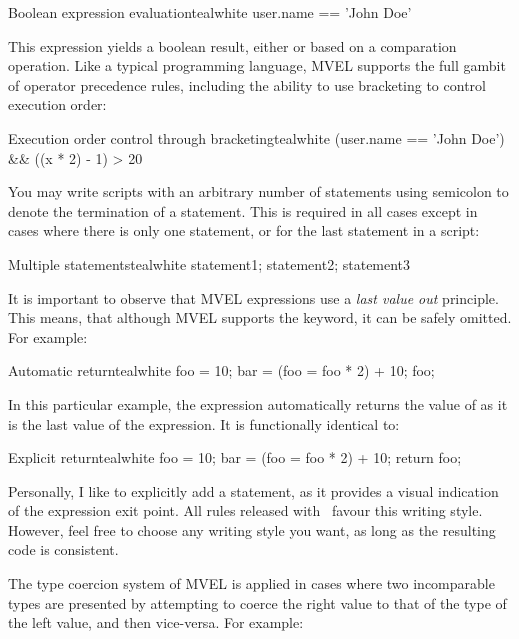 \begin{codebox}{Boolean expression evaluation}{teal}{\icnote}{white}
user.name == 'John Doe'
\end{codebox}

This expression yields a boolean result, either  or  based on a comparation operation. Like a typical programming language, MVEL supports the full gambit of operator precedence rules, including the ability to use bracketing to control execution order:

\begin{codebox}{Execution order control through bracketing}{teal}{\icnote}{white}
(user.name == 'John Doe') && ((x * 2) - 1) > 20
\end{codebox}

You may write scripts with an arbitrary number of statements using semicolon to denote the termination of a statement. This is required in all cases except in cases where there is only one statement, or for the last statement in a script:

\begin{codebox}{Multiple statements}{teal}{\icnote}{white}
statement1; statement2; statement3
\end{codebox}

It is important to observe that MVEL expressions use a \emph{last value out} principle. This means, that although MVEL supports the  keyword, it can be safely omitted. For example:

\begin{codebox}{Automatic return}{teal}{\icnote}{white}
foo = 10;
bar = (foo = foo * 2) + 10;
foo;
\end{codebox}

In this particular example, the expression automatically returns the value of  as it is the last value of the expression. It is functionally identical to:

\begin{codebox}{Explicit return}{teal}{\icnote}{white}
foo = 10;
bar = (foo = foo * 2) + 10;
return foo;
\end{codebox}

Personally, I like to explicitly add a  statement, as it provides a visual indication of the expression exit point. All rules released with \arara\ favour this writing style. However, feel free to choose any writing style you want, as long as the resulting code is consistent.

The type coercion system of MVEL is applied in cases where two incomparable types are presented by attempting to coerce the right value to that of the type of the left value, and then vice-versa. For example:

